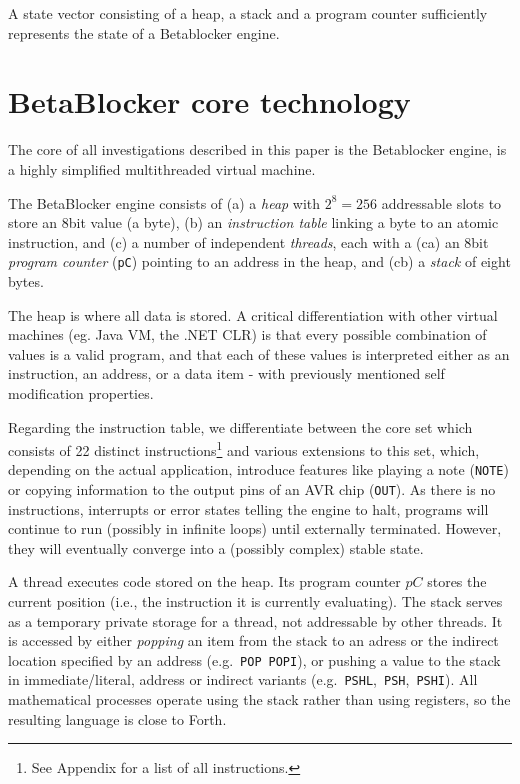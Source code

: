 \documentclass[letterpaper, 12pt]{article}
\begin{document}
A state vector consisting of a heap, a stack and a program counter sufficiently represents the state of a Betablocker engine.

\parskip 18pt

\section{BetaBlocker core technology} 
\label{sec:betablocker_core}


The core of all investigations described in this paper is the Betablocker engine, is a highly simplified multithreaded virtual machine.

The BetaBlocker engine consists of 
(a) a \emph{heap} with  $2^8 = 256$ addressable slots to store an 8bit value (a byte), 
(b) an \emph{instruction table} linking a byte to an atomic instruction, and
(c) a number of independent \emph{threads}, each with a 
	(ca) an 8bit \emph{program counter} (\texttt{pC}) pointing to an address in the heap, and (cb) a \emph{stack} of eight bytes.

The heap is where all data is stored. A critical differentiation with other virtual machines (eg. Java VM, the .NET CLR) is that every possible combination of values is a valid program, and that each of these values is interpreted either as an instruction, an address, or a data item - with previously mentioned self modification properties.

Regarding the instruction table, we differentiate between the core set which consists of 22 distinct instructions\footnote{
	See Appendix for a list of all instructions.
} and various extensions to this set, which, depending on the actual application, introduce features like playing a note (\texttt{NOTE}) or copying information to the output pins of an AVR chip (\texttt{OUT}).
As there is no instructions, interrupts or error states telling the engine to halt, programs will continue to run (possibly in infinite loops) until externally terminated.
However, they will eventually converge into a (possibly complex) stable state.

A thread executes code stored on the heap. 
Its program counter $pC$ stores the current position (i.e., the instruction it is currently evaluating).
The stack serves as a temporary private storage for a thread, not addressable by other threads. 
It is accessed by either \emph{popping} an item from the stack to an adress or the indirect location specified by an address (e.g.~\texttt{POP}~\texttt{POPI}), or pushing a value to the stack in immediate/literal, address or indirect variants  (e.g.~\texttt{PSHL},~\texttt{PSH},~\texttt{PSHI}). All mathematical processes operate using the stack rather than using registers, so the resulting language is close to Forth.
\end{document}
